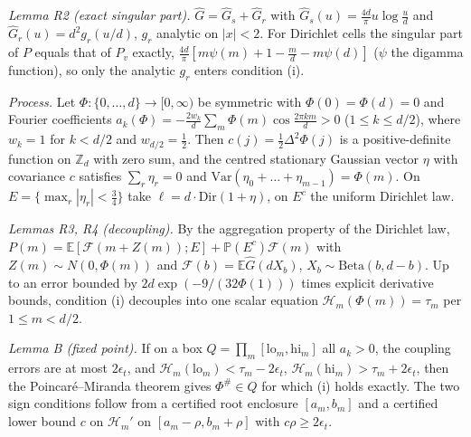 \documentclass[11pt]{amsart}
\theoremstyle{definition}
\theoremstyle{remark}
\numberwithin{equation}{section}
\newcommand{\Z}{\mathbb{Z}}
\begin{document}
\emph{Lemma R2 (exact singular part).} $\hat G=\hat G_s+\hat G_r$ with $\hat G_s(u)=\frac{4d}\pi u\log\frac ud$ and
$\hat G_r(u)=d^2g_r(u/d)$, $g_r$ analytic on $|x|<2$. For Dirichlet cells the singular part of $P$ equals that of $P_v$
exactly, $\frac{4d}{\pi}[m\psi(m)+1-\frac md-m\psi(d)]$ ($\psi$ the digamma function), so only the analytic $g_r$
enters condition (i).

\emph{Process.} Let $\Phi:\{0,\dots,d\}\to[0,\infty)$ be symmetric with $\Phi(0)=\Phi(d)=0$ and Fourier coefficients
$a_k(\Phi)=-\frac{2w_k}d\sum_m\Phi(m)\cos\frac{2\pi km}d>0$ ($1\le k\le d/2$), where $w_k=1$ for $k<d/2$ and
$w_{d/2}=\frac12$. Then $c(j)=\frac12\Delta^2\Phi(j)$ is a positive-definite
function on $\Z_d$ with zero sum, and the centred stationary Gaussian vector $\eta$ with covariance $c$ satisfies
$\sum_r\eta_r=0$ and $\mathrm{Var}(\eta_0+\dots+\eta_{m-1})=\Phi(m)$. On $E=\{\max_r|\eta_r|<\frac34\}$ take
$\ell=d\cdot\mathrm{Dir}(1+\eta)$, on $E^c$ the uniform Dirichlet law.

\emph{Lemmas R3, R4 (decoupling).} By the aggregation property of the Dirichlet law,
$P(m)=\mathbb{E}[\mathcal F(m+Z(m));E]+\mathbb{P}(E^c)\mathcal F(m)$ with $Z(m)\sim N(0,\Phi(m))$ and
$\mathcal F(b)=\mathbb{E}\hat G(dX_b)$, $X_b\sim\mathrm{Beta}(b,d-b)$. Up to an error bounded by
$2d\exp(-9/(32\Phi(1)))$ times explicit derivative bounds, condition (i) decouples into one scalar equation
$\mathcal H_m(\Phi(m))=\tau_m$ per $1\le m<d/2$.

\emph{Lemma B (fixed point).} If on a box $Q=\prod_m[\mathrm{lo}_m,\mathrm{hi}_m]$ all $a_k>0$, the coupling errors are
at most $2\epsilon_t$, and $\mathcal H_m(\mathrm{lo}_m)<\tau_m-2\epsilon_t$, $\mathcal H_m(\mathrm{hi}_m)>\tau_m+2\epsilon_t$,
then the Poincar\'e--Miranda theorem\cite{Kulpa} gives $\Phi^\#\in Q$ for which (i) holds exactly. The two sign
conditions follow from a certified root enclosure $[a_m,b_m]$ and a certified lower bound $c$ on $\mathcal H_m'$ on
$[a_m-\rho,b_m+\rho]$ with $c\rho\ge2\epsilon_t$.
\end{document}
